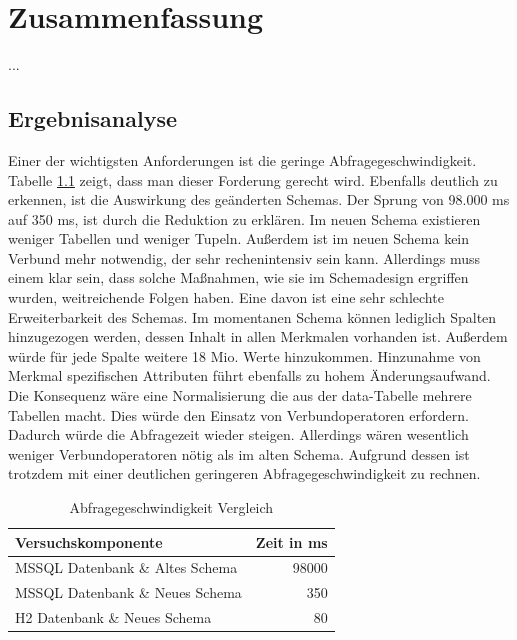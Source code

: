 
\chapter{Zusammenfassung}

...

\section{Ergebnisanalyse}

Einer der wichtigsten Anforderungen ist die geringe Abfragegeschwindigkeit. Tabelle \ref{table:vergleich_abfragegeschwindigkeit} zeigt, dass man dieser Forderung gerecht wird. Ebenfalls deutlich zu erkennen, ist die Auswirkung des geänderten Schemas. Der Sprung von 98.000 ms auf 350 ms, ist durch die Reduktion zu erklären. Im neuen Schema existieren weniger Tabellen und weniger Tupeln. Außerdem ist im neuen Schema kein Verbund mehr notwendig, der sehr rechenintensiv sein kann. Allerdings muss einem klar sein, dass solche Maßnahmen, wie sie im Schemadesign ergriffen wurden, weitreichende Folgen haben. Eine davon ist eine sehr schlechte Erweiterbarkeit des Schemas. Im momentanen Schema können lediglich Spalten hinzugezogen werden, dessen Inhalt in allen Merkmalen vorhanden ist. Außerdem würde für jede Spalte weitere 18 Mio. Werte hinzukommen. Hinzunahme von Merkmal spezifischen Attributen führt ebenfalls zu hohem Änderungsaufwand. Die Konsequenz wäre eine Normalisierung die aus der data-Tabelle mehrere Tabellen macht. Dies würde den Einsatz von Verbundoperatoren erfordern. Dadurch würde die Abfragezeit wieder steigen. Allerdings wären wesentlich weniger Verbundoperatoren nötig als im alten Schema. Aufgrund dessen ist trotzdem mit einer deutlichen geringeren Abfragegeschwindigkeit zu rechnen.  

\begin{table}[htbp]
\centering
\label{table:vergleich_abfragegeschwindigkeit}
\begin{tabular} {l | r}
Versuchskomponente & Zeit in ms  \\ \hline
MSSQL Datenbank \& Altes Schema & 98000 \\
MSSQL Datenbank \& Neues Schema & 350 \\
H2 Datenbank \& Neues Schema & 80 \\
\end{tabular}
\caption{Abfragegeschwindigkeit Vergleich}
\end{table}


